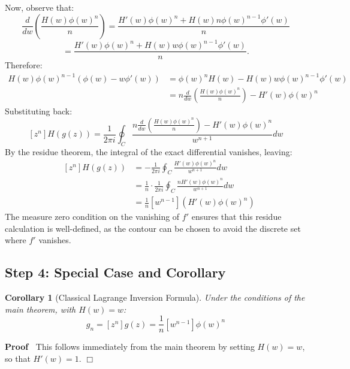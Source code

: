 \documentclass{article}
\newenvironment{proof}{\noindent\textbf{Proof\ }}{\hspace*{\fill}$\Box$\medskip}
\newtheorem{corollary}{Corollary}
\begin{document}
Now, observe that:
\[ \frac{d}{dw} \left( \frac{H (w) \phi (w)^n}{n} \right) = \frac{H' (w) \phi
   (w)^n + H (w) n \phi (w)^{n - 1} \phi' (w)}{n} \]
\[ = \frac{H' (w) \phi (w)^n + H (w) w \phi (w)^{n - 1} \phi' (w)}{n} . \]
Therefore:
\begin{equation}
  \begin{array}{ll}
    H (w) \phi (w)^{n - 1}  (\phi (w) - w \phi' (w)) & = \phi (w)^n H (w) - H
    (w) w \phi (w)^{n - 1} \phi' (w)\\
    & = n \frac{d}{dw} \left( \frac{H (w) \phi (w)^n}{n} \right) - H' (w)
    \phi (w)^n
  \end{array}
\end{equation}
Substituting back:
\[ [z^n] H (g (z)) = \frac{1}{2 \pi i}  \oint_C \frac{n \frac{d}{dw} \left(
   \frac{H (w) \phi (w)^n}{n} \right) - H' (w) \phi (w)^n}{w^{n + 1}} dw \]
By the residue theorem, the integral of the exact differential vanishes,
leaving:
\begin{equation}
  \begin{array}{l}
    
  \end{array} \begin{array}{ll}
    {}[z^n] H (g (z)) & = - \frac{1}{2 \pi i}  \oint_C \frac{H' (w) \phi
    (w)^n}{w^{n + 1}} dw\\
    & = \frac{1}{n} \cdot \frac{1}{2 \pi i}  \oint_C \frac{nH' (w) \phi
    (w)^n}{w^{n + 1}} dw\\
    & = \frac{1}{n} [w^{n - 1}]  (H' (w) \phi (w)^n)
  \end{array}
\end{equation}
The measure zero condition on the vanishing of $f'$ ensures that this residue
calculation is well-defined, as the contour can be chosen to avoid the
discrete set where $f'$ vanishes.

\subsection{Step 4: Special Case and Corollary}

\begin{corollary}
  [Classical Lagrange Inversion Formula] Under the conditions of the main
  theorem, with $H (w) = w$:
  \begin{equation}
    g_n = [z^n] g (z) = \frac{1}{n} [w^{n - 1}] \phi (w)^n
  \end{equation}
\end{corollary}

\begin{proof}
  This follows immediately from the main theorem by setting $H (w) = w$, so
  that $H' (w) = 1$.
\end{proof}
\end{document}
